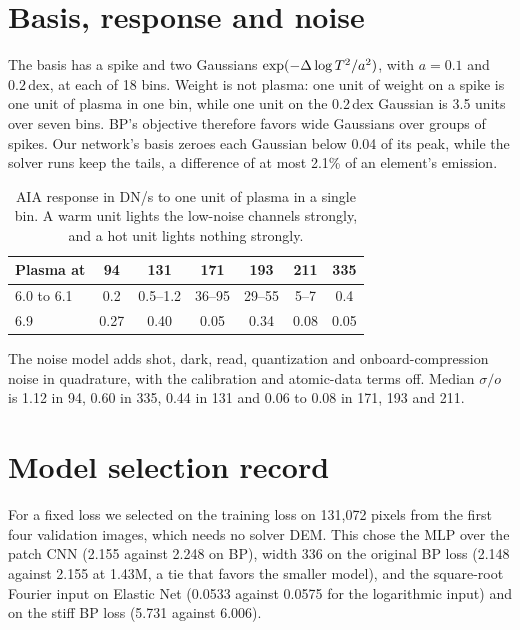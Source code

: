 \section{Basis, response and noise}
\label{app:basis}

The basis has a spike and two Gaussians $\exp(-\Delta\log T^2/a^2)$, with $a=0.1$ and $0.2$\,dex, at each of 18 bins. Weight is not plasma: one unit of weight on a spike is one unit of plasma in one bin, while one unit on the 0.2\,dex Gaussian is 3.5 units over seven bins. BP's objective therefore favors wide Gaussians over groups of spikes. Our network's basis zeroes each Gaussian below 0.04 of its peak, while the solver runs keep the tails, a difference of at most 2.1\% of an element's emission.

\begin{table}[h]
\centering
\small
\caption{AIA response in DN/s to one unit of plasma in a single bin. A warm unit lights the low-noise channels strongly, and a hot unit lights nothing strongly.}
\label{tab:response}
\setlength{\tabcolsep}{3.2pt}
\begin{tabular}{@{}lcccccc@{}}
\toprule
Plasma at & 94 & 131 & 171 & 193 & 211 & 335\\
\midrule
\logT{} 6.0 to 6.1 & 0.2 & 0.5--1.2 & 36--95 & 29--55 & 5--7 & 0.4\\
\logT{} 6.9 & 0.27 & 0.40 & 0.05 & 0.34 & 0.08 & 0.05\\
\bottomrule
\end{tabular}
\end{table}

The noise model adds shot, dark, read, quantization and onboard-compression noise in quadrature, with the calibration and atomic-data terms off. Median $\sigma/o$ is 1.12 in 94\Ang, 0.60 in 335\Ang, 0.44 in 131\Ang{} and 0.06 to 0.08 in 171, 193 and 211\Ang.

\section{Model selection record}
\label{app:selection}

For a fixed loss we selected on the training loss on 131,072 pixels from the first four validation images, which needs no solver DEM. This chose the MLP over the patch CNN (2.155 against 2.248 on BP), width 336 on the original BP loss (2.148 against 2.155 at 1.43M, a tie that favors the smaller model), and the square-root Fourier input on Elastic Net (0.0533 against 0.0575 for the logarithmic input) and on the stiff BP loss (5.731 against 6.006).

